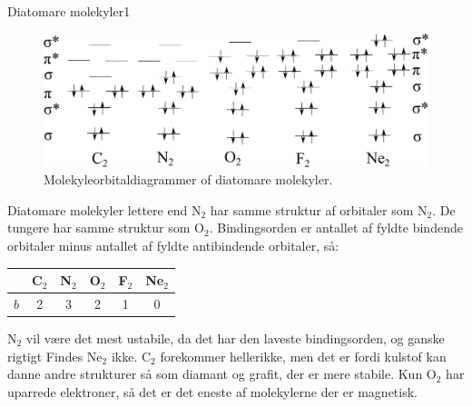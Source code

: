 \begin{opgave}{Diatomare molekyler}{1}
\begin{figure}[h]
\center
\includegraphics[width = \textwidth]{Atom-ogMolekylefysik/billeder/diatomar.pdf}
\caption{Molekyleorbitaldiagrammer of diatomare molekyler.}
\label{opg:diatomar}
\end{figure}
\opg Diatomare molekyler lettere end N$_2$ har samme struktur af orbitaler som N$_2$. De tungere har samme struktur som O$_2$.
\opg Bindingsorden er antallet af fyldte bindende orbitaler minus antallet af fyldte antibindende orbitaler, så:
\begin{tabular}{c|c c c c c}
&C$_2$&N$_2$&O$_2$&F$_2$&Ne$_2$\\\hline
$b$&2&3&2&1&0
\end{tabular}
\opg N$_2$ vil være det mest ustabile, da det har den laveste bindingsorden, og ganske rigtigt Findes Ne$_2$ ikke. C$_2$ forekommer hellerikke, men det er fordi kulstof kan danne andre strukturer så som diamant og grafit, der er mere stabile.
\opg Kun O$_2$ har uparrede elektroner, så det er det eneste af molekylerne der er magnetisk.
\end{opgave}
